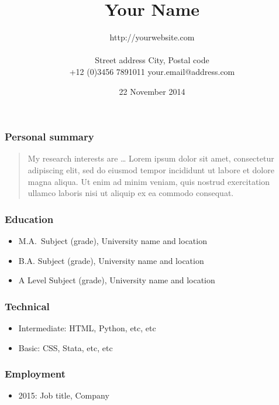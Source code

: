 \documentclass[11pt, a4paper]{article}
\title{Your Name} %
\date{22 November 2014\\} %
\author{http://yourwebsite.com\\\\
Street address \textbar{} City, Postal code\\ %
+12 (0)3456 7891011 \textbar{} your.email@address.com } %
\providecommand{\tightlist}{%
  \setlength{\itemsep}{0pt}\setlength{\parskip}{0pt}}
\begin{document}

\maketitle
\begin{raggedright}
\subsubsection{Personal summary}

\begin{quote}
My research interests are \ldots{} Lorem ipsum dolor sit amet,
consectetur adipiscing elit, sed do eiusmod tempor incididunt ut labore
et dolore magna aliqua. Ut enim ad minim veniam, quis nostrud
exercitation ullamco laboris nisi ut aliquip ex ea commodo consequat.
\end{quote}

\subsubsection{Education}

\begin{itemize}
\tightlist
\item
  M.A.~Subject (grade), University name and location
\item
  B.A. Subject (grade), University name and location
\item
  A Level Subject (grade), University name and location
\end{itemize}

\subsubsection{Technical}

\begin{itemize}
\tightlist
\item
  Intermediate: HTML, Python, etc, etc
\item
  Basic: CSS, Stata, etc, etc
\end{itemize}

\subsubsection{Employment}

\begin{itemize}
\tightlist
\item
  2015: Job title, Company
\end{itemize}


\end{raggedright}
\end{document}
